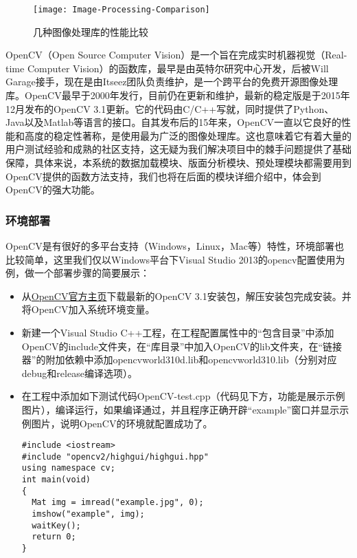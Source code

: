 \begin{figure}[htbp]
	\centering
	\caption{几种图像处理库的性能比较}
	\texttt{[image: Image-Processing-Comparison]}
	\label{pic:image-processing-comparison}
\end{figure}

OpenCV（Open Source Computer Vision）是一个旨在完成实时机器视觉（Real-time Computer Vision）的函数库，最早是由英特尔研究中心开发，后被Will Garage接手，现在是由Itseez团队负责维护，是一个跨平台的免费开源图像处理库\citep{wiki:OpenCV}。OpenCV最早于2000年发行，目前仍在更新和维护，最新的稳定版是于2015年12月发布的OpenCV 3.1更新。它的代码由C/C++写就，同时提供了Python、Java以及Matlab等语言的接口\citep{wiki:OpenCV}。自其发布后的15年来，OpenCV一直以它良好的性能和高度的稳定性著称，是使用最为广泛的图像处理库。这也意味着它有着大量的用户测试经验和成熟的社区支持，这无疑为我们解决项目中的棘手问题提供了基础保障，具体来说，本系统的数据加载模块、版面分析模块、预处理模块都需要用到OpenCV提供的函数方法支持，我们也将在后面的模块详细介绍中，体会到OpenCV的强大功能。

\subsubsection*{环境部署}
OpenCV是有很好的多平台支持（Windows，Linux，Mac等）特性，环境部署也比较简单，这里我们仅以Windows平台下Visual Studio 2013的opencv配置使用为例，做一个部署步骤的简要展示：
\begin{itemize}
  \item 从\href{http://opencv.org/}{OpenCV官方主页}下载最新的OpenCV 3.1安装包，解压安装包完成安装。并将OpenCV加入系统环境变量。
  \item 新建一个Visual Studio C++工程，在工程配置属性中的“包含目录”中添加OpenCV的include文件夹，在“库目录”中加入OpenCV的lib文件夹，在“链接器”的附加依赖中添加opencvworld310d.lib和opencvworld310.lib（分别对应debug和release编译选项）。
  \item 在工程中添加如下测试代码OpenCV-test.cpp（代码见下方，功能是展示示例图片），编译运行，如果编译通过，并且程序正确开辟“example”窗口并显示示例图片，说明OpenCV的环境就配置成功了。
\begin{lstlisting}[label=OpenCV-test.cpp]
#include <iostream>
#include "opencv2/highgui/highgui.hpp"
using namespace cv;
int main(void)
{
  Mat img = imread("example.jpg", 0);
  imshow("example", img);
  waitKey();
  return 0;
}
\end{lstlisting}
\end{itemize}

